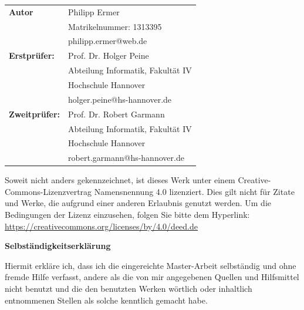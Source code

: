 \documentclass[fontsize=12pt,paper=a4,twoside=semi,parskip=half-,headsepline,headinclude]{scrreprt}
\begin{document}
\newpage 
\thispagestyle{empty}
\quad 


  \newpage \thispagestyle{empty}
 \begin{tabular}{ll}
{\bfseries\sffamily Autor} &  Philipp Ermer \\ 
            & Matrikelnummer: 1313395 \\
            & philipp.ermer@web.de \\[5ex]
{\bfseries\sffamily Erstprüfer:} & Prof. Dr. Holger Peine \\
          & Abteilung Informatik, Fakultät IV \\
         & Hochschule Hannover \\
        & holger.peine@hs-hannover.de \\[5ex]
{\bfseries\sffamily Zweitprüfer:} &Prof. Dr. Robert Garmann \\
          & Abteilung Informatik, Fakultät IV \\
         & Hochschule Hannover \\
        & robert.garmann@hs-hannover.de
\end{tabular}

\vfill

Soweit nicht anders gekennzeichnet, ist dieses Werk unter einem
Creative-Commons-Lizenzvertrag Namensnennung 4.0 lizenziert.
Dies gilt nicht für Zitate und Werke, die aufgrund einer anderen Erlaubnis
genutzt werden.
Um die Bedingungen der Lizenz einzusehen, folgen Sie bitte dem Hyperlink:\\
\url{https://creativecommons.org/licenses/by/4.0/deed.de}

\vfill

\begin{center} \sffamily\bfseries Selbständigkeitserklärung \end{center}

Hiermit erkläre ich, dass ich die eingereichte Master-Arbeit
selbständig und ohne fremde Hilfe verfasst, andere als die von mir angegebenen Quellen
und Hilfsmittel nicht benutzt und die den benutzten Werken wörtlich oder
inhaltlich entnommenen Stellen als solche kenntlich gemacht habe. 
\vspace*{7ex}
\end{document}
